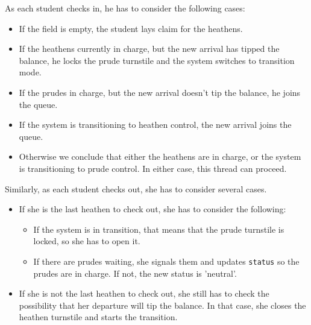 \documentclass{book}
\begin{document}
As each student checks in, he has to
consider the following cases:

\begin{itemize}

    \item If the field is empty, the student lays claim for the heathens.

    \item If the heathens currently in charge, but the new arrival
          has tipped the balance, he locks the prude turnstile and the
          system switches to transition mode.

    \item If the prudes in charge, but the new arrival doesn't
          tip the balance, he joins the queue.

    \item If the system is transitioning to heathen control, the new arrival
          joins the queue.

    \item Otherwise we conclude that either the heathens are in charge, or the
          system is transitioning to prude control.  In either case, this
          thread can proceed.

\end{itemize}

Similarly, as each student checks out, she has to consider several
cases.

\begin{itemize}

    \item If she is the last heathen to check out, she has to
          consider the following:

          \begin{itemize}

              \item If the system is in transition, that means that the prude
                    turnstile is locked, so she has to open it.

              \item If there are prudes waiting, she signals them and
                    updates {\tt status} so the prudes are in charge.  If not, the
                    new status is 'neutral'.

          \end{itemize}

    \item If she is not the last heathen to check out, she still has to
          check the possibility that her departure will tip the balance.  In
          that case, she closes the heathen turnstile and starts the
          transition.

\end{itemize}
\end{document}
